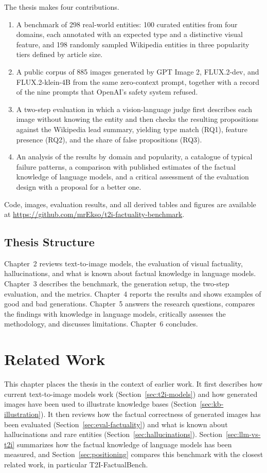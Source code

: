 The thesis makes four contributions.
\begin{enumerate}
\item A benchmark of 298 real-world entities: 100 curated entities from four
domains, each annotated with an expected type and a distinctive visual feature,
and 198 randomly sampled Wikipedia entities in three popularity tiers defined
by article size.
\item A public corpus of 885 images generated by GPT Image 2, FLUX.2-dev, and
FLUX.2-klein-4B from the same zero-context prompt, together with a record of
the nine prompts that OpenAI's safety system refused.
\item A two-step evaluation in which a vision-language judge first describes
each image without knowing the entity and then checks the resulting
propositions against the Wikipedia lead summary, yielding type match (RQ1),
feature presence (RQ2), and the share of false propositions (RQ3).
\item An analysis of the results by domain and popularity, a catalogue of
typical failure patterns, a comparison with published estimates of the
factual knowledge of language models, and a critical assessment of the
evaluation design with a proposal for a better one.
\end{enumerate}
Code, images, evaluation results, and all derived tables and figures are
available at \url{https://github.com/mrEkso/t2i-factuality-benchmark}.

\section{Thesis Structure}

Chapter~2 reviews text-to-image models, the evaluation of visual factuality,
hallucinations, and what is known about factual knowledge in language models.
Chapter~3 describes the benchmark, the generation setup, the two-step
evaluation, and the metrics. Chapter~4 reports the results and shows examples
of good and bad generations. Chapter~5 answers the research questions, compares
the findings with knowledge in language models, critically assesses the
methodology, and discusses limitations.
Chapter~6 concludes.

\chapter{Related Work}

This chapter places the thesis in the context of earlier work. It first
describes how current text-to-image models work
(Section~\ref{sec:t2i-models}) and how generated images have been used to
illustrate knowledge bases (Section~\ref{sec:kb-illustration}). It then
reviews how the factual correctness of generated images has been evaluated
(Section~\ref{sec:eval-factuality}) and what is known about hallucinations and
rare entities (Section~\ref{sec:hallucinations}). Section~\ref{sec:llm-vs-t2i}
summarizes how the factual knowledge of language models has been measured, and
Section~\ref{sec:positioning} compares this benchmark with the closest related
work, in particular T2I-FactualBench.

